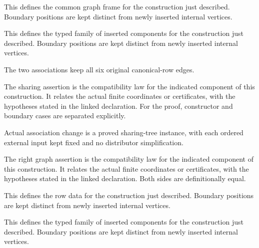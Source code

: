 This defines the common graph frame for the construction just described. Boundary positions are kept distinct from newly inserted internal vertices.
\par{}

This defines the typed family of inserted components for the construction just described. Boundary positions are kept distinct from newly inserted internal vertices.
\par{}

The two associations keep all six original canonical-row edges.
\par{}

The sharing assertion is the compatibility law for the indicated component of this construction. It relates the actual finite coordinates or certificates, with the hypotheses stated in the linked declaration.
For the proof, constructor and boundary cases are separated explicitly.
\par{}

Actual association change is a proved sharing-tree instance, with each ordered external input kept fixed and no distributor simplification.
\par{}

The right graph assertion is the compatibility law for the indicated component of this construction. It relates the actual finite coordinates or certificates, with the hypotheses stated in the linked declaration.
Both sides are definitionally equal.
\par{}

This defines the row data for the construction just described. Boundary positions are kept distinct from newly inserted internal vertices.
\par{}

This defines the typed family of inserted components for the construction just described. Boundary positions are kept distinct from newly inserted internal vertices.
\par{}


